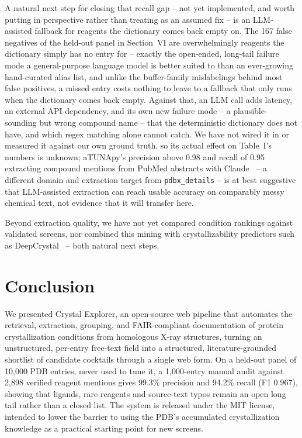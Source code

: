 A natural next step for closing that recall gap -- not yet
implemented, and worth putting in perspective rather than treating as
an assumed fix -- is an LLM-assisted fallback for reagents the
dictionary comes back empty on. The 167 false negatives of the held-out
panel in Section~VI are overwhelmingly reagents the dictionary simply has no
entry for -- exactly the open-ended, long-tail failure mode a
general-purpose language model is better suited to than an
ever-growing hand-curated alias list, and unlike the buffer-family
mislabelings behind most false positives, a missed entry costs nothing
to leave to a fallback that only runs when the dictionary comes back
empty. Against that, an LLM call adds latency, an external API
dependency, and its own new failure mode -- a plausible-sounding but
wrong compound name -- that the deterministic dictionary does not have,
and which regex matching alone cannot catch. We have not wired it in or
measured it against our own ground truth, so its actual effect on
Table~I's numbers is unknown; aTUNApy's precision above 0.98 and recall
of 0.95 extracting compound mentions from PubMed abstracts with
Claude~\cite{delmoralmorales2026atunapy} -- a different domain and
extraction target from \texttt{pdbx\_details} -- is at best suggestive
that LLM-assisted extraction can reach usable accuracy on comparably
messy chemical text, not evidence that it will transfer here.

Beyond extraction quality, we have not yet
compared condition rankings against validated screens, nor combined this
mining with crystallizability predictors such as
DeepCrystal~\cite{elbasir2019deepcrystal} -- both natural next steps.

\section{Conclusion}

We presented Crystal Explorer, an open-source web pipeline that automates
the retrieval, extraction, grouping, and FAIR-compliant documentation of
protein crystallization conditions from homologous X-ray structures,
turning an unstructured, per-entry free-text field into a structured,
literature-grounded shortlist of candidate cocktails through a single
web form. On a held-out panel of 10{,}000 PDB entries, never used to
tune it, a 1{,}000-entry manual audit against 2{,}898 verified reagent
mentions gives 99.3\% precision and 94.2\% recall (F1 0.967),
showing that ligands, rare reagents and source-text typos remain an
open long tail rather than a closed list. The system is released under the MIT license, intended
to lower the barrier to using the PDB's accumulated crystallization
knowledge as a practical starting point for new screens.

